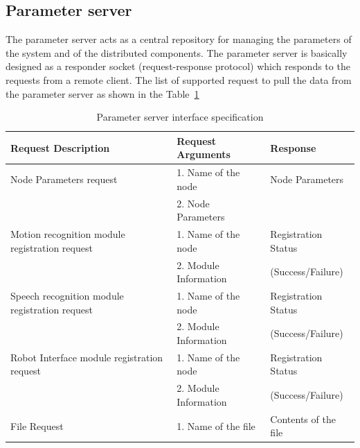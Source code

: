 \subsection*{Parameter server} 
The parameter server acts as a central repository for managing the parameters of the system and of the distributed components. The parameter server is basically designed as a responder socket (request-response protocol) which responds to the requests from a remote client. The list of supported request to pull the data from the parameter server as shown in the Table~\ref{table:parameter_server}
\begin{table}[H]
\centering
\small
\caption{Parameter server interface specification}
\label{table:parameter_server}
\begin{tabular}{| p{6.6cm} | p{3.5cm} | p{3cm} |}
\hline
  \textbf{Request Description} & \textbf{Request Arguments} & \textbf{Response}
  \tabularnewline \hline
  Node Parameters request & 1. Name of the node & Node Parameters \\
  {}                      & 2. Node Parameters & {}
                                          \tabularnewline\hline
                                          
  Motion recognition module registration request &  1. Name of the node & Registration Status   \\
  {}                                             &  2. Module Information & {(Success/Failure)}
                                          \tabularnewline\hline

  Speech recognition module registration request &  1. Name of the node & Registration Status   \\
  {}                                             &  2. Module Information & {(Success/Failure)}
                                          \tabularnewline\hline
  
  Robot Interface module registration request &  1. Name of the node & Registration Status   \\
  {}                                             &  2. Module Information & {(Success/Failure)}
                                          \tabularnewline\hline
  File Request &   1. Name of the file & Contents of the file
  										 \tabularnewline\hline
\end{tabular}
\end{table}
                                          
